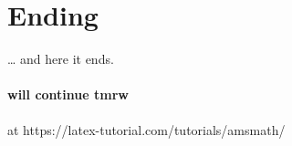 \documentclass[a4paper, 12pt]{article}
\begin{document}
\section{Ending}
\ldots{} and here it ends.

\paragraph{will continue tmrw} at https://latex-tutorial.com/tutorials/amsmath/
\end{document}
